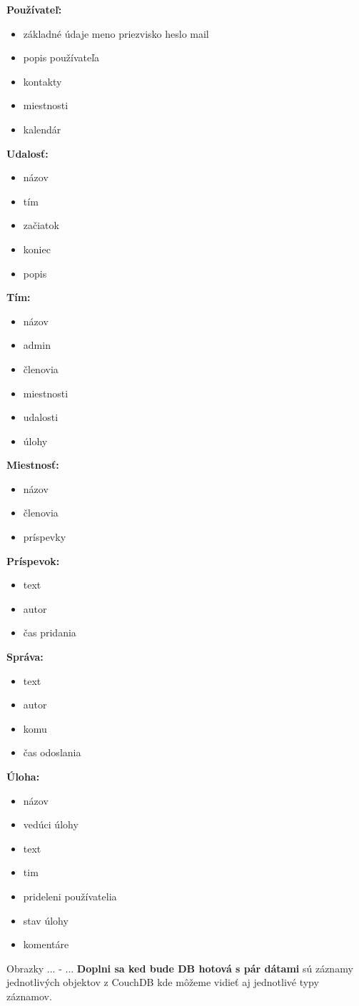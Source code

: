 \textbf{Používateľ:}
\indent\begin{itemize}
    \item základné údaje meno priezvisko heslo mail
    \item popis používateľa
    \item kontakty 
    \item miestnosti
    \item kalendár 
\end{itemize}

\textbf{Udalosť:}
\indent\begin{itemize}
    \item názov
    \item tím 
    \item začiatok
    \item koniec
    \item popis 
\end{itemize}

\textbf{Tím:}
\indent\begin{itemize}
    \item názov
    \item admin 
    \item členovia  
    \item miestnosti 
    \item udalosti 
    \item úlohy 
\end{itemize}

\textbf{Miestnosť:}
\indent\begin{itemize}
    \item názov
    \item členovia 
    \item príspevky 
\end{itemize}

\textbf{Príspevok:}
\indent\begin{itemize}
    \item text
    \item autor
    \item čas pridania
\end{itemize}

\textbf{Správa:}
\indent\begin{itemize}
    \item text
    \item autor 
    \item komu
    \item čas odoslania
\end{itemize}

\textbf{Úloha:}
\indent\begin{itemize}
    \item názov
    \item vedúci úlohy
    \item text
    \item tim
    \item prideleni používatelia
    \item stav úlohy
    \item komentáre
\end{itemize}

\indent Obrazky ... - ... \textbf{Doplni sa ked bude DB hotová s pár dátami} sú záznamy jednotlivých objektov z CouchDB kde môžeme vidieť aj jednotlivé typy záznamov. 
